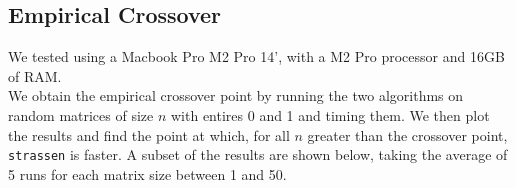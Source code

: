 \documentclass[11pt]{scrartcl}
\theoremstyle{dotlessP}
\theoremstyle{dotlessN}
\theoremstyle{dotN}
\begin{document}
\subsection{Empirical Crossover}
We tested using a Macbook Pro M2 Pro 14', with a M2 Pro processor and 16GB of RAM.\\

We obtain the empirical crossover point by running the two algorithms on random matrices of size $n$ with entires 0
and 1 and timing them. We then
plot the results and find the point at which, for all $n$ greater than the crossover point, \texttt{strassen} is
faster. A subset of the results are shown below, taking the average of 5 runs for each matrix size between 1 and 50.
\begin{table}[H]
    \begin{subtable}{0.5\textwidth}
\end{subtable}
\end{table}
\end{document}
